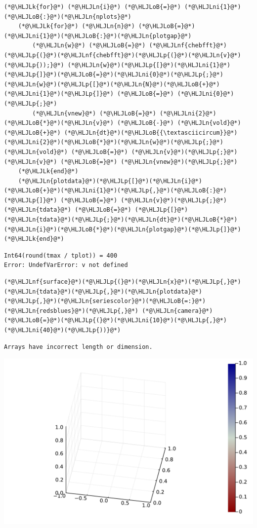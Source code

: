 \documentclass[12pt,a4paper]{article}
\newcommand{\HLJLk}[1]{\textcolor[RGB]{148,91,176}{\textbf{#1}}}
\newcommand{\HLJLn}[1]{#1}
\newcommand{\HLJLnf}[1]{\textcolor[RGB]{66,102,213}{#1}}
\newcommand{\HLJLni}[1]{\textcolor[RGB]{59,151,46}{#1}}
\newcommand{\HLJLoB}[1]{\textcolor[RGB]{102,102,102}{\textbf{#1}}}
\newcommand{\HLJLp}[1]{#1}
\begin{document}
\begin{lstlisting}
(*@\HLJLk{for}@*) (*@\HLJLn{i}@*) (*@\HLJLoB{=}@*) (*@\HLJLni{1}@*)(*@\HLJLoB{:}@*)(*@\HLJLn{nplots}@*)
    (*@\HLJLk{for}@*) (*@\HLJLn{n}@*) (*@\HLJLoB{=}@*) (*@\HLJLni{1}@*)(*@\HLJLoB{:}@*)(*@\HLJLn{plotgap}@*)
        (*@\HLJLn{w}@*) (*@\HLJLoB{=}@*) (*@\HLJLnf{chebfft}@*)(*@\HLJLp{(}@*)(*@\HLJLnf{chebfft}@*)(*@\HLJLp{(}@*)(*@\HLJLn{v}@*)(*@\HLJLp{));}@*) (*@\HLJLn{w}@*)(*@\HLJLp{[}@*)(*@\HLJLni{1}@*)(*@\HLJLp{]}@*)(*@\HLJLoB{=}@*)(*@\HLJLni{0}@*)(*@\HLJLp{;}@*) (*@\HLJLn{w}@*)(*@\HLJLp{[}@*)(*@\HLJLn{N}@*)(*@\HLJLoB{+}@*)(*@\HLJLni{1}@*)(*@\HLJLp{]}@*) (*@\HLJLoB{=}@*) (*@\HLJLni{0}@*)(*@\HLJLp{;}@*)
        (*@\HLJLn{vnew}@*) (*@\HLJLoB{=}@*) (*@\HLJLni{2}@*)(*@\HLJLoB{*}@*)(*@\HLJLn{v}@*) (*@\HLJLoB{-}@*) (*@\HLJLn{vold}@*) (*@\HLJLoB{+}@*) (*@\HLJLn{dt}@*)(*@\HLJLoB{{\textasciicircum}}@*)(*@\HLJLni{2}@*)(*@\HLJLoB{*}@*)(*@\HLJLn{w}@*)(*@\HLJLp{;}@*) (*@\HLJLn{vold}@*) (*@\HLJLoB{=}@*) (*@\HLJLn{v}@*)(*@\HLJLp{;}@*) (*@\HLJLn{v}@*) (*@\HLJLoB{=}@*) (*@\HLJLn{vnew}@*)(*@\HLJLp{;}@*)
    (*@\HLJLk{end}@*)
    (*@\HLJLn{plotdata}@*)(*@\HLJLp{[}@*)(*@\HLJLn{i}@*)(*@\HLJLoB{+}@*)(*@\HLJLni{1}@*)(*@\HLJLp{,}@*)(*@\HLJLoB{:}@*)(*@\HLJLp{]}@*) (*@\HLJLoB{=}@*) (*@\HLJLn{v}@*)(*@\HLJLp{;}@*) (*@\HLJLn{tdata}@*) (*@\HLJLoB{=}@*) (*@\HLJLp{[}@*)(*@\HLJLn{tdata}@*)(*@\HLJLp{;}@*)(*@\HLJLn{dt}@*)(*@\HLJLoB{*}@*)(*@\HLJLn{i}@*)(*@\HLJLoB{*}@*)(*@\HLJLn{plotgap}@*)(*@\HLJLp{]}@*)
(*@\HLJLk{end}@*)
\end{lstlisting}

\begin{lstlisting}
Int64(round(tmax / tplot)) = 400
Error: UndefVarError: v not defined
\end{lstlisting}


\begin{lstlisting}
(*@\HLJLnf{surface}@*)(*@\HLJLp{(}@*)(*@\HLJLn{x}@*)(*@\HLJLp{,}@*)(*@\HLJLn{tdata}@*)(*@\HLJLp{,}@*)(*@\HLJLn{plotdata}@*)(*@\HLJLp{,}@*)(*@\HLJLn{seriescolor}@*)(*@\HLJLoB{=:}@*)(*@\HLJLn{redsblues}@*)(*@\HLJLp{,}@*) (*@\HLJLn{camera}@*)(*@\HLJLoB{=}@*)(*@\HLJLp{(}@*)(*@\HLJLni{10}@*)(*@\HLJLp{,}@*)(*@\HLJLni{40}@*)(*@\HLJLp{))}@*)
\end{lstlisting}

\begin{lstlisting}
Arrays have incorrect length or dimension.
\end{lstlisting}

\includegraphics[width=\linewidth]{jl_ottS6U/Chebyshev_13_1.pdf}
\end{document}
